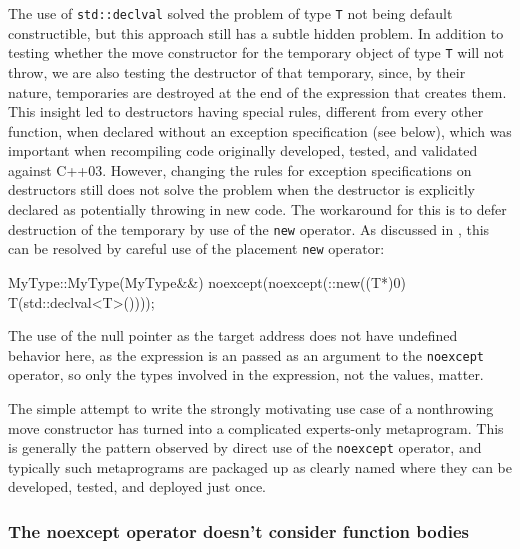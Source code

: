 \noindent The use of \lstinline!std::declval! solved the problem of type \lstinline!T!
not being default constructible, but this approach still has a subtle
hidden problem. In addition to testing whether the move constructor for
the temporary object of type \lstinline!T! will not throw, we are also
testing the destructor of that temporary, since, by their nature,
temporaries are destroyed at the end of the expression that creates
them. This insight led to destructors having special rules, different
from every other function, when declared without an exception
specification (see  below), which was important when
recompiling code originally developed, tested, and validated against
C++03. However, changing the rules for exception specifications on
destructors still does not solve the problem when the destructor is
explicitly declared as potentially throwing in new code. The workaround
for this is to defer destruction of the temporary by use of the
\lstinline!new! operator. As discussed in , this can be
resolved by careful use of the placement \lstinline!new! operator:

\begin{emcppslisting}
MyType::MyType(MyType&&) noexcept(noexcept(::new((T*)0) T(std::declval<T>())));
\end{emcppslisting}
    

\noindent The use of the null pointer as the target address does not have
undefined behavior here, as the expression is an  passed as an argument to the \lstinline!noexcept! operator, so
only the types involved in the expression, not the values, matter.

The simple attempt to write the strongly motivating use case of a
nonthrowing move constructor has turned into a complicated experts-only
metaprogram. This is generally the pattern observed by direct use of the
\lstinline!noexcept! operator, and typically such metaprograms are packaged
up as clearly named  where they can be developed,
tested, and deployed just once.

\subsubsection[The \lstinline!noexcept! operator doesn’t consider function bodies]{The {\SubsubsecCode noexcept} operator doesn’t consider function bodies}\label{the-noexcept-operator-doesn’t-consider-function-bodies}

